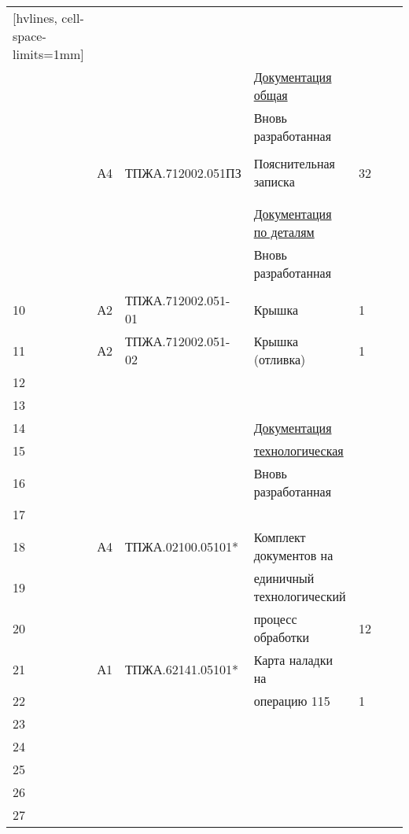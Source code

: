 \documentclass[a4paper,14pt]{extarticle}
\begin{document}
	
	\itshape
	\noindent
	\begin{NiceTabular}{p{4mm}p{4mm}p{64mm}p{60mm}p{4mm}p{4mm}p{15mm}}[hvlines, cell-space-limits=1mm]
		 &
		 &
		 &
		 &
		 &
		 &
		 \\
		
		 & & & \underline{Документация общая} & & & \\
		 & & & Вновь разработанная & & & \\
		 & & & & & & \\
		 & А4 & \centering ТПЖА.712002.051ПЗ & Пояснительная записка & 32 & & \\
		 & & & & & & \\
		 & & & & & & \\
		 & & & \underline{Документация по деталям} & & & \\
		 & & & Вновь разработанная & & & \\
		 & & & & & & \\
		10 & А2 & \centering ТПЖА.712002.051-01 & Крышка & 1 & & \\
		11 & А2 & \centering ТПЖА.712002.051-02 & Крышка (отливка) & 1 & & \\
		12 & & & & & & \\
		13 & & & & & & \\
		14 & & & \underline{Документация} & & & \\
		15 & & & \underline{технологическая} & & & \\
		16 & & & Вновь разработанная & & & \\
		17 & & & & & & \\
		18 & А4 & \centering ТПЖА.02100.05101* & Комплект документов на & & & \\
		19 & & & единичный технологический & & & \\
		20 & & & процесс обработки & 12 & & \\
		21 & А1 & \centering ТПЖА.62141.05101* & Карта наладки на & & & \\
		22 & & & операцию 115 & 1 & & \\
		23 & & & & & & \\
		24 & & & & & & \\
		25 & & & & & & \\
		26 & & & & & & \\
		27 & & & & & &
	\end{NiceTabular}
	
\end{document}
